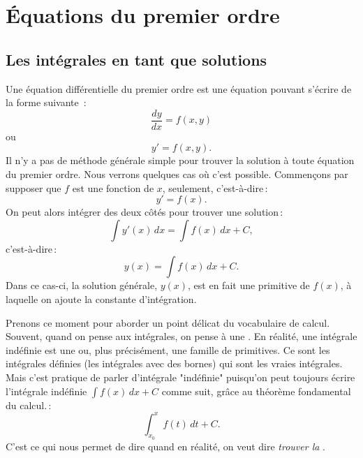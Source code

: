 \chapter{Équations du premier ordre} \label{fo:chapter}


\section{Les intégrales en tant que solutions}
\label{integralsols:section}


Une équation différentielle du premier ordre est une équation pouvant s'écrire de la forme suivante \,: 
%
\begin{equation*}
\frac{dy}{dx} = f(x,y) 
\end{equation*}
ou 
\begin{equation*}
y' = f(x,y) .
\end{equation*}
Il n'y a pas de méthode générale simple pour trouver la solution  à toute équation du premier ordre.  Nous verrons quelques cas où c'est possible.  Commençons par supposer que $f$ est une fonction de $x$, seulement, c'est-à-dire\,: 
\begin{equation} \label{ias:inteq}
y' = f(x) .
\end{equation}
On peut alors intégrer des deux côtés pour trouver une solution\,: 
\begin{equation*}
\int y'(x) \,dx = \int f(x) \,dx + C ,
\end{equation*}
c'est-à-dire\,: 
\begin{equation*}
y(x) = \int f(x) \,dx + C .
\end{equation*}
Dans ce cas-ci, la solution générale, $y(x)$, est en fait une primitive de $f(x)$, à laquelle on ajoute la constante d'intégration.

\medskip

Prenons ce moment pour aborder un point délicat du vocabulaire de calcul.  Souvent, quand on pense aux intégrales, on pense à une .  En réalité, une intégrale indéfinie est une \emph{} ou, plus précisément, une famille de primitives.  Ce sont les intégrales définies (les intégrales avec des bornes) qui sont les vraies intégrales.  Mais c'est pratique de parler d'intégrale "indéfinie" puisqu'on peut toujours écrire l'intégrale indéfinie 
$\int f(x) \,dx + C$ comme suit, grâce au théorème fondamental du calcul.\,: 
\begin{equation*}
\int_{x_0}^x f(t) \,dt + C .
\end{equation*}
C'est ce qui nous permet de dire  \emph{ } quand en réalité, on veut dire  
\emph{trouver la }.

